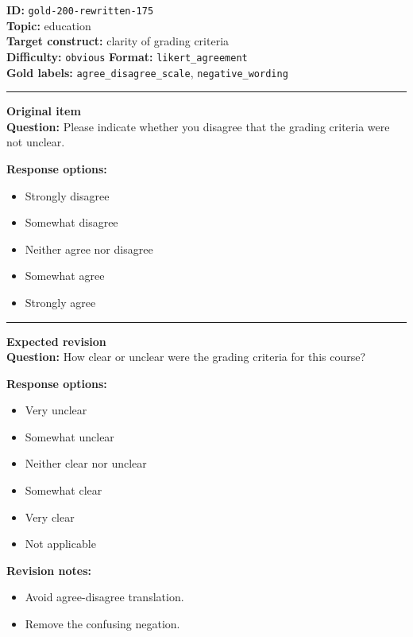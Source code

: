 \documentclass[10pt,a4paper]{article}
\newcommand{\sectionline}{\vspace{0.15em}\hrule\vspace{0.35em}}
\begin{document}
\begin{tcolorbox}[colframe=FlawRed,colback=white,colbacktitle=FlawRed!9,coltitle=black,title={Item 175\hfill Flawed item}]
\textbf{ID:} \texttt{gold-200-rewritten-175}\\
\textbf{Topic:} education\\
\textbf{Target construct:} clarity of grading criteria\\
\textbf{Difficulty:} \texttt{obvious} \quad \textbf{Format:} \texttt{likert\_agreement}\\
\textbf{Gold labels:} \texttt{agree\_disagree\_scale}, \texttt{negative\_wording}\\
\sectionline
\textbf{Original item}\\
\textbf{Question:} Please indicate whether you disagree that the grading criteria were not unclear.
\par\textbf{Response options:}
\begin{itemize}
\item Strongly disagree
\item Somewhat disagree
\item Neither agree nor disagree
\item Somewhat agree
\item Strongly agree
\end{itemize}
\sectionline
\textbf{Expected revision}\\
\textbf{Question:} How clear or unclear were the grading criteria for this course?
\par\textbf{Response options:}
\begin{itemize}
\item Very unclear
\item Somewhat unclear
\item Neither clear nor unclear
\item Somewhat clear
\item Very clear
\item Not applicable
\end{itemize}
\par\textbf{Revision notes:}
\begin{itemize}
\item Avoid agree-disagree translation.
\item Remove the confusing negation.
\end{itemize}
\end{tcolorbox}
\end{document}
